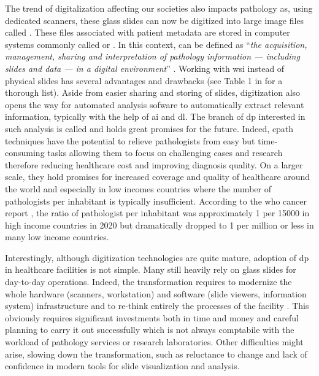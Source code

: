 The trend of digitalization affecting our societies also impacts pathology as, using dedicated scanners, these glass slides can now be digitized into large image files called . These files associated with patient metadata are stored in computer systems commonly called  or . In this context,  can be defined as ``\textit{the acquisition, management, sharing and interpretation of pathology information — including slides and data — in a digital environment}'' \parencite{doolan2019whatisdp}. Working with \acrshort{wsi} instead of physical slides has several advantages and drawbacks (see Table 1 in \parencite{jahn2020digital} for a thorough list). Aside from easier sharing and storing of slides, digitization also opens the way for automated analysis sofware to automatically extract relevant information, typically with the help of \acrlong{ai} and \acrlong{dl}. The branch of \acrlong{dp} interested in such analysis is called  and holds great promises for the future. Indeed, \acrshort{cpath} techniques have the potential to relieve pathologists from easy but time-consuming tasks allowing them to focus on challenging cases and research therefore reducing healthcare cost and improving diagnosis quality. On a larger scale, they hold promises for increased coverage and quality of healthcare around the world and especially in low incomes countries where the number of pathologists per inhabitant is typically insufficient. According to the \acrshort{who} cancer report \parencite{world2020report}, the ratio of pathologist per inhabitant was approximately 1 per 15000 in high income countries in 2020 but dramatically dropped to 1 per million or less in many low income countries. 

Interestingly, although digitization technologies are quite mature, adoption of \acrlong{dp} in healthcare facilities is not simple. Many still heavily rely on glass slides for day-to-day operations. Indeed, the transformation requires to modernize the whole hardware (scanners, workstation) and software (slide viewers, information system) infrastructure and to re-think entirely the processes of the facility \parencite{temprana2022digipatics}. This obviously requires significant investments both in time and money and careful planning to carry it out successfully which is not always comptabile with the workload of pathology services or research laboratories. Other difficulties might arise, slowing down the transformation, such as reluctance to change and lack of confidence in modern tools for slide visualization and analysis. 

